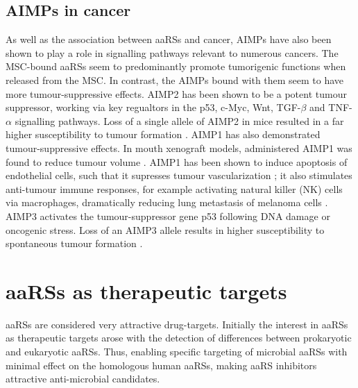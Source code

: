 \subsection{AIMPs in cancer}
As well as the association between aaRSs and cancer, AIMPs have also been shown to play a role in signalling pathways relevant to numerous cancers.
The MSC-bound aaRSs seem to predominantly promote tumorigenic functions when released from the MSC.
In contrast, the AIMPs bound with them seem to have more tumour-suppressive effects.
AIMP2 has been shown to be a potent tumour suppressor, working via key regualtors in the p53, c-Myc, Wnt, TGF-$\beta$ and TNF-$\alpha$ signalling pathways.
Loss of a single allele of AIMP2 in mice resulted in a far higher susceptibility to tumour formation \cite{choi2009multidirectional}.
AIMP1 has also demonstrated tumour-suppressive effects.
In mouth xenograft models, administered AIMP1 was found to reduce tumour volume \cite{han2010antitumor, lee2006antitumor}.
AIMP1 has been shown to induce apoptosis of endothelial cells, such that it supresses tumour vascularization \cite{park2002dose}; it also stimulates anti-tumour immune responses, for example activating natural killer (NK) cells via macrophages, dramatically reducing lung metastasis of melanoma cells \cite{kim2017aminoacyl}.
AIMP3 activates the tumour-suppressor gene p53 following DNA damage or oncogenic stress.
Loss of an AIMP3 allele results in higher susceptibility to spontaneous tumour formation \cite{park2005haploinsufficient}.


\section{aaRSs as therapeutic targets}
aaRSs are considered very attractive drug-targets.
Initially the interest in aaRSs as therapeutic targets arose with the detection of differences between prokaryotic and eukaryotic aaRSs.
Thus, enabling specific targeting of microbial aaRSs with minimal effect on the homologous human aaRSs, making aaRS inhibitors attractive anti-microbial candidates.

